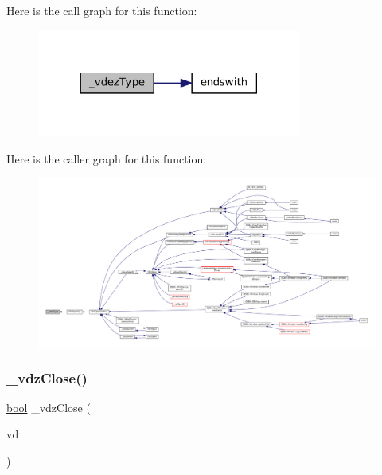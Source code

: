 Here is the call graph for this function\+:
\nopagebreak
\begin{figure}[H]
\begin{center}
\leavevmode
\includegraphics[width=246pt]{vfs-zip_8c_abefae5482409acabbad9ccb2549f1c35_cgraph}
\end{center}
\end{figure}
Here is the caller graph for this function\+:
\nopagebreak
\begin{figure}[H]
\begin{center}
\leavevmode
\includegraphics[width=350pt]{vfs-zip_8c_abefae5482409acabbad9ccb2549f1c35_icgraph}
\end{center}
\end{figure}
\mbox{\label{vfs-zip_8c_ab0c37e0c87dc08d24f8acda1bd6603c9}} 
\subsubsection{\texorpdfstring{\+\_\+vdz\+Close()}{\_vdzClose()}}
{\footnotesize\ttfamily \mbox{\hyperlink{libretro_8h_a4a26dcae73fb7e1528214a068aca317e}{bool}} \+\_\+vdz\+Close (\begin{DoxyParamCaption}\item[{struct V\+Dir $\ast$}]{vd }\end{DoxyParamCaption})\hspace{0.3cm}{\ttfamily [static]}}

